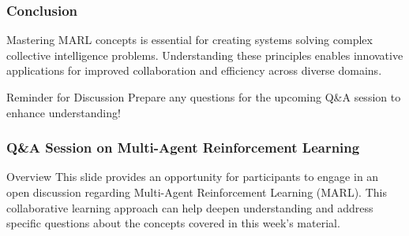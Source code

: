 \documentclass[aspectratio=169]{beamer}
\begin{document}
\begin{frame}
    \frametitle{Conclusion}
    Mastering MARL concepts is essential for creating systems solving complex collective intelligence problems. Understanding these principles enables innovative applications for improved collaboration and efficiency across diverse domains.
    \begin{block}{Reminder for Discussion}
        Prepare any questions for the upcoming Q\&A session to enhance understanding!
    \end{block}
\end{frame}

\begin{frame}[fragile]
    \frametitle{Q\&A Session on Multi-Agent Reinforcement Learning}
    \begin{block}{Overview}
        This slide provides an opportunity for participants to engage in an open discussion 
        regarding Multi-Agent Reinforcement Learning (MARL). This collaborative learning 
        approach can help deepen understanding and address specific questions about the 
        concepts covered in this week's material.
    \end{block}
\end{frame}
\end{document}
